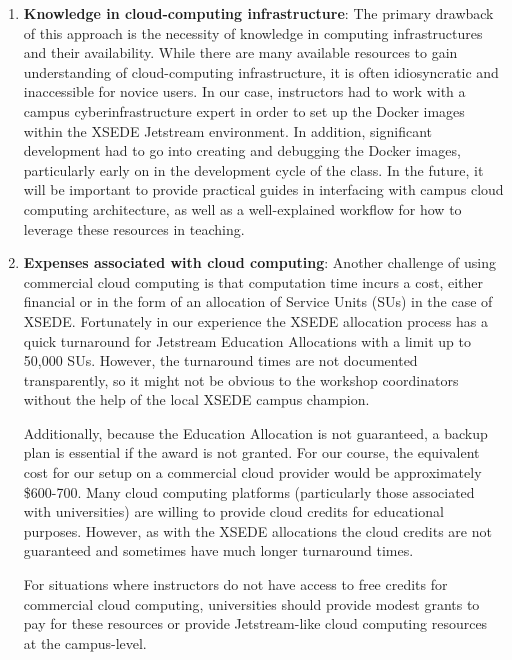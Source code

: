 \begin{enumerate}

\item {\bf Knowledge in cloud-computing infrastructure}: The primary drawback of
this approach is the necessity of knowledge in computing infrastructures and
their availability. While there are many available resources to gain
understanding of cloud-computing infrastructure, it is often idiosyncratic and
inaccessible for novice users. In our case, instructors had to work with a
campus cyberinfrastructure expert in order to set up the Docker images within
the XSEDE Jetstream environment. In addition, significant development had to go
into creating and debugging the Docker images, particularly early on in the
development cycle of the class. In the future, it will be important to provide
practical guides in interfacing with campus cloud computing architecture, as
well as a well-explained workflow for how to leverage these resources in
teaching.

\item {\bf Expenses associated with cloud computing}: Another challenge of using
commercial cloud computing is that computation time incurs a cost, either
financial or in the form of an allocation of Service Units (SUs) in the case of
XSEDE. Fortunately in our experience the XSEDE allocation process has a quick
turnaround for Jetstream Education Allocations with a limit up to 50,000 SUs.
However, the turnaround times are not documented transparently, so it might not
be obvious to the workshop coordinators without the help of the local XSEDE campus
champion.

Additionally, because the Education Allocation is not guaranteed, a backup plan
is essential if the award is not granted. For our course, the equivalent cost
for our setup on a commercial cloud provider would be approximately \$600-700.
Many cloud computing platforms (particularly those associated with universities)
are willing to provide cloud credits for educational purposes. However, as with
the XSEDE allocations the cloud credits are not guaranteed and sometimes have
much longer turnaround times.

For situations where instructors do not have access to free credits for
commercial cloud computing, universities should provide modest grants to pay for
these resources or provide Jetstream-like cloud computing resources at the
campus-level.


\end{enumerate}
